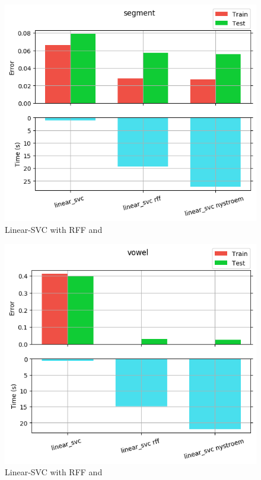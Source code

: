 \begin{figure}[th]
\centering
\includegraphics[scale=\imgscale]{Figures/2_5/segment}
\decoRule
\caption[2.5 segment]{Linear-SVC with RFF and \Nys}
\label{fig:2_5_segment}
\end{figure}

\begin{figure}[th]
\centering
\includegraphics[scale=\imgscale]{Figures/2_5/vowel}
\decoRule
\caption[2.5 vowel]{Linear-SVC with RFF and \Nys}
\label{fig:vowel}
\end{figure}
